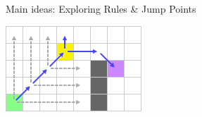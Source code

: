 \documentclass{presentation}
\begin{document}
\begin{frame}{Main ideas: Exploring Rules \& Jump Points}
\begin{center}
\begin{minipage}{0.3\textwidth}
		\end{minipage}%
		\hfill%
		\begin{minipage}{0.3\textwidth}
			\includegraphics[width=\textwidth]{figures/extra_geschnitten/dm(jump).png}
		\end{minipage}%
	\end{center}
\end{frame}
\end{document}
